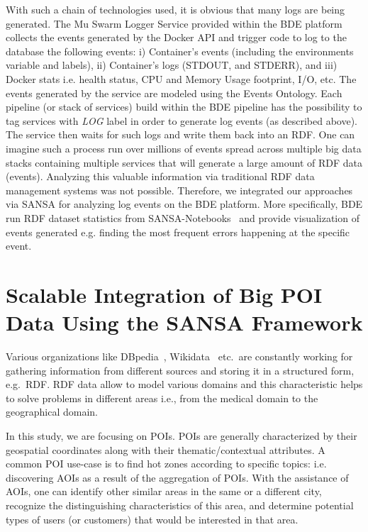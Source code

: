 With such a chain of technologies used, it is obvious that many logs are being generated.
The Mu Swarm Logger Service provided within the BDE platform collects the events generated by the Docker \gls{API} and trigger code to log to the database the following events: i) Container's events (including the environments variable and labels), ii) Container's logs (STDOUT, and STDERR), and iii) Docker stats i.e. health status, CPU and Memory Usage footprint, I/O, etc.
The events generated by the service are modeled using the Events Ontology.
Each pipeline (or stack of services) build within the BDE pipeline has the possibility to tag services with \textit{LOG} label in order to generate log events (as described above).
The service then waits for such logs and write them back into an \gls{RDF}.
One can imagine such a process run over millions of events spread across multiple big data stacks containing multiple services that will generate a large amount of \gls{RDF} data (events).
Analyzing this valuable information via traditional \gls{RDF} data management systems was not possible.
Therefore, we integrated our approaches via SANSA for analyzing log events on the BDE platform.
More specifically, BDE run \gls{RDF} dataset statistics from SANSA-Notebooks~\cite{iermilov-2017-sansa-iswc-demo} and provide visualization of events generated e.g. finding the most frequent errors happening at the specific event.

\section{Scalable Integration of Big POI Data Using the SANSA Framework}
\label{sec:slipo-use-case}

Various organizations like DBpedia~\cite{dbpedia-swj}, Wikidata~\cite{Vrandecic:2014:WFC:2661061.2629489} etc.\ are constantly working for gathering information from different sources and storing it in a structured form, e.g.~\gls{RDF}.
\gls{RDF} data allow to model various domains and this characteristic helps to solve problems in different areas i.e., from the medical domain to the geographical domain. 

In this study, we are focusing on \gls{POI}s.
\gls{POI}s are generally characterized by their geospatial coordinates along with their thematic/contextual attributes.
A common \gls{POI} use-case is to find hot zones according to specific topics: i.e. discovering \gls{AOI}s as a result of the aggregation of \gls{POI}s.
With the assistance of \gls{AOI}s, one can identify other similar areas in the same or a different city, recognize the distinguishing characteristics of this area, and determine potential types of users (or customers) that would be interested in that area.

